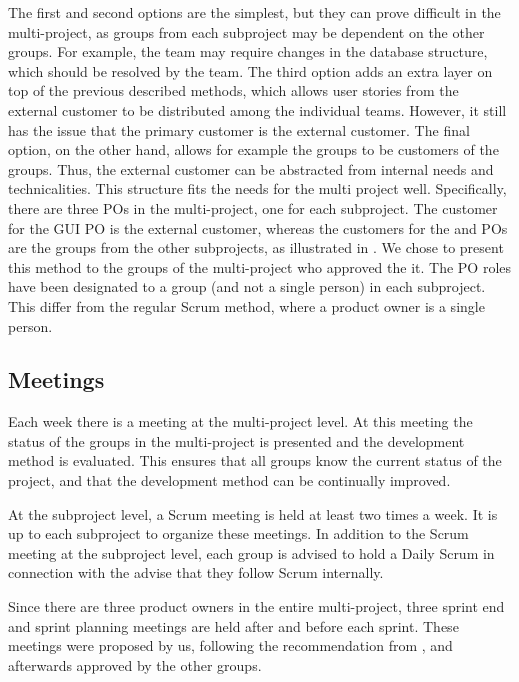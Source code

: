 \begin{description}
The first and second options are the simplest, but they can prove difficult in the multi-project, as groups from each subproject may be dependent on the other groups. For example, the \gui{} team may require changes in the database structure, which should be resolved by the \db team. The third option adds an extra layer on top of the previous described methods, which allows user stories from the external customer to be distributed among the individual teams. However, it still has the issue that the primary customer is the external customer. The final option, on the other hand, allows for example the \gui groups to be customers of the \bd groups. Thus, the external customer can be abstracted from internal needs and technicalities. This structure fits the needs for the multi project well. Specifically, there are three POs in the multi-project, one for each subproject. The customer for the GUI PO is the external customer, whereas the customers for the \db and \bd POs are the groups from the other subprojects, as illustrated in . We chose to present this method to the groups of the multi-project who approved the it. The PO roles have been designated to a group (and not a single person) in each subproject. This differ from the regular Scrum method, where a product owner is a single person.

\end{description}


\subsection{Meetings}\label{sec:meetings}
Each week there is a meeting at the multi-project level. At this meeting the status of the groups in the multi-project is presented and the development method is evaluated. This ensures that all groups know the current status of the project, and that the development method can be continually improved.

At the subproject level, a Scrum meeting is held at least two times a week. It is up to each subproject to organize these meetings. In addition to the Scrum meeting at the subproject level, each group is advised to hold a Daily Scrum in connection with the advise that they follow Scrum internally.

Since there are three product owners in the entire multi-project, three sprint end and sprint planning meetings are held after and before each sprint. These meetings were proposed by us, following the recommendation from \textcite{bird_davies_2007}, and afterwards approved by the other groups.


